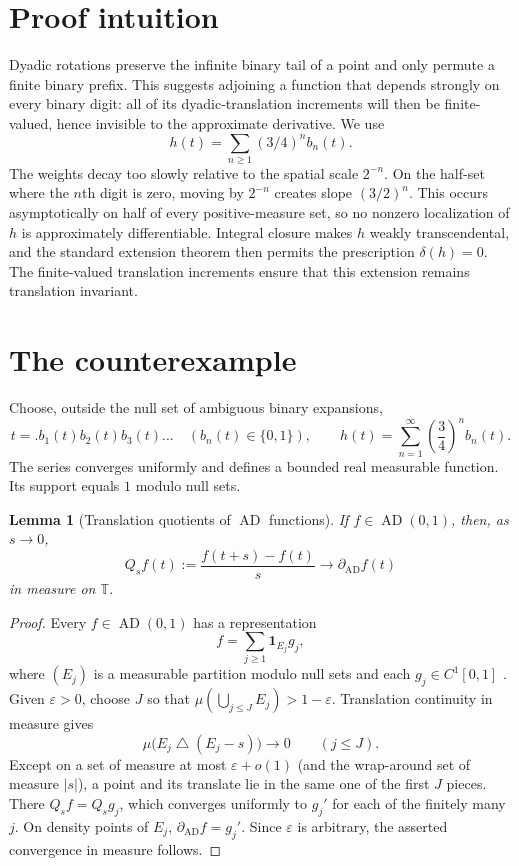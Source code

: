 \documentclass[11pt]{article}
\newtheorem{lemma}{Lemma}
\newcommand{\AD}{\operatorname{AD}}
\newcommand{\T}{\mathbb T}
\newcommand{\1}{\mathbf 1}
\begin{document}
\section{Proof intuition}

Dyadic rotations preserve the infinite binary tail of a point and only
permute a finite binary prefix.  This suggests adjoining a function that
depends strongly on every binary digit: all of its dyadic-translation
increments will then be finite-valued, hence invisible to the approximate
derivative.  We use
\[
 h(t)=\sum_{n\geq1}(3/4)^n b_n(t).
\]
The weights decay too slowly relative to the spatial scale $2^{-n}$.  On the
half-set where the $n$th digit is zero, moving by $2^{-n}$ creates slope
$(3/2)^n$.  This occurs asymptotically on half of every positive-measure set,
so no nonzero localization of $h$ is approximately differentiable.  Integral
closure makes $h$ weakly transcendental, and the standard extension theorem
then permits the prescription $\delta(h)=0$.  The finite-valued translation
increments ensure that this extension remains translation invariant.

\section{The counterexample}

Choose, outside the null set of ambiguous binary expansions,
\[
 t=.b_1(t)b_2(t)b_3(t)\ldots\quad (b_n(t)\in\{0,1\}),
 \qquad
 h(t)=\sum_{n=1}^{\infty}\left(\frac34\right)^n b_n(t).
\]
The series converges uniformly and defines a bounded real measurable
function.  Its support equals $1$ modulo null sets.

\begin{lemma}[Translation quotients of $\AD$ functions]\label{lem:measure}
If $f\in\AD(0,1)$, then, as $s\to0$,
\[
 Q_s f(t):=\frac{f(t+s)-f(t)}s
 \longrightarrow \partial_{\!\AD}f(t)
\]
in measure on $\T$.
\end{lemma}

\begin{proof}
Every $f\in\AD(0,1)$ has a representation
\[
 f=\sum_{j\geq1}\1_{E_j}g_j,
\]
where $(E_j)$ is a measurable partition modulo null sets and each
$g_j\in C^1[0,1]$ \cite[Proposition~3.4]{BKS}.  Given $\varepsilon>0$,
choose $J$ so that $\mu(\bigcup_{j\leq J}E_j)>1-\varepsilon$.  Translation
continuity in measure gives
\[
 \mu\bigl(E_j\mathbin{\triangle}(E_j-s)\bigr)\longrightarrow0
 \qquad(j\leq J).
\]
Except on a set of measure at most $\varepsilon+o(1)$ (and the wrap-around
set of measure $|s|$), a point and its translate lie in the same one of the
first $J$ pieces.  There $Q_s f=Q_s g_j$, which converges uniformly to
$g_j'$ for each of the finitely many $j$.  On density points of $E_j$,
$\partial_{\!\AD}f=g_j'$.  Since $\varepsilon$ is arbitrary, the asserted
convergence in measure follows.
\end{proof}
\end{document}
